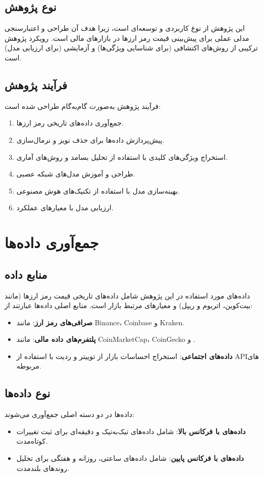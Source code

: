 \subsection{نوع پژوهش}
این پژوهش از نوع کاربردی و توسعه‌ای است، زیرا هدف آن طراحی و اعتبارسنجی مدلی عملی برای پیش‌بینی قیمت رمز ارزها در بازارهای مالی است. رویکرد پژوهش ترکیبی از روش‌های اکتشافی (برای شناسایی ویژگی‌ها) و آزمایشی (برای ارزیابی مدل) است.

\subsection{فرآیند پژوهش}
فرآیند پژوهش به‌صورت گام‌به‌گام طراحی شده است:
\begin{enumerate}
	\item جمع‌آوری داده‌های تاریخی رمز ارزها.
	\item پیش‌پردازش داده‌ها برای حذف نویز و نرمال‌سازی.
	\item استخراج ویژگی‌های کلیدی با استفاده از تحلیل بسامد و روش‌های آماری.
	\item طراحی و آموزش مدل‌های شبکه عصبی.
	\item بهینه‌سازی مدل با استفاده از تکنیک‌های هوش مصنوعی.
	\item ارزیابی مدل با معیارهای عملکرد.
\end{enumerate}

\section{جمع‌آوری داده‌ها}
\label{sec:data_collection}

\subsection{منابع داده}
داده‌های مورد استفاده در این پژوهش شامل داده‌های تاریخی قیمت رمز ارزها (مانند بیت‌کوین، اتریوم و ریپل) و معیارهای مرتبط بازار است. منابع اصلی داده‌ها عبارتند از:
\begin{itemize}
	\item \textbf{صرافی‌های رمز ارز}: مانند Binance، Coinbase و Kraken.
	\item \textbf{پلتفرم‌های داده مالی}: مانند CoinMarketCap، CoinGecko و .
	\item \textbf{داده‌های اجتماعی}: استخراج احساسات بازار از توییتر و ردیت با استفاده از APIهای مربوطه.
\end{itemize}

\subsection{نوع داده‌ها}
داده‌ها در دو دسته اصلی جمع‌آوری می‌شوند:
\begin{itemize}
	\item \textbf{داده‌های با فرکانس بالا}: شامل داده‌های تیک‌به‌تیک و دقیقه‌ای برای ثبت تغییرات کوتاه‌مدت.
	\item \textbf{داده‌های با فرکانس پایین}: شامل داده‌های ساعتی، روزانه و هفتگی برای تحلیل روندهای بلندمدت.
\end{itemize}

